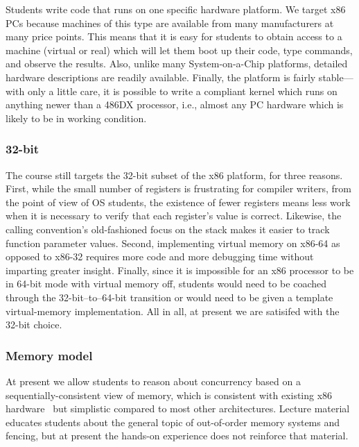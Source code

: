 Students write code that runs on one specific
hardware platform.
We target x86 PCs because machines of this type are
available from many manufacturers at many price points.
This means that it is easy for students to obtain access
to a machine (virtual or real) which will let them boot
up their code, type commands, and observe the results.
Also, unlike many System-on-a-Chip platforms,
detailed hardware descriptions are readily available.
Finally, the platform is fairly stable---with only a
little care, it is possible to write a compliant
kernel which runs on anything newer than a 486DX processor,
i.e., almost any PC hardware which is likely to be in
working condition.

\subsubsection{32-bit}

The course still targets the 32-bit
subset of the x86 platform, for three reasons.
First, while the small number of registers is
frustrating for compiler writers,
from the point of view of OS students,
the existence of fewer registers means less work
when it is necessary to verify that each register's
value is correct.
Likewise, the calling convention's old-fashioned focus on the stack
makes it easier to track function parameter values.
Second, implementing virtual memory on x86-64 as
opposed to x86-32 requires more code and more
debugging time without imparting greater insight.
Finally, since it is impossible for an x86 processor
to be in 64-bit mode with virtual memory off,
students would need to be coached through the
32-bit--to--64-bit transition or would need
to be given a template virtual-memory implementation.
All in all, at present we are satisifed with
the 32-bit choice.

\subsubsection{Memory model}

At present we allow students
to reason about concurrency based on a
sequentially-consistent view of
memory, which is consistent with
existing x86 hardware~\cite{SewellSOZNM:x86tso-cacm10}
but simplistic compared to most other
architectures.
Lecture material educates students about the
general topic of out-of-order memory systems
and fencing,
but at present the hands-on experience does not
reinforce that material.

